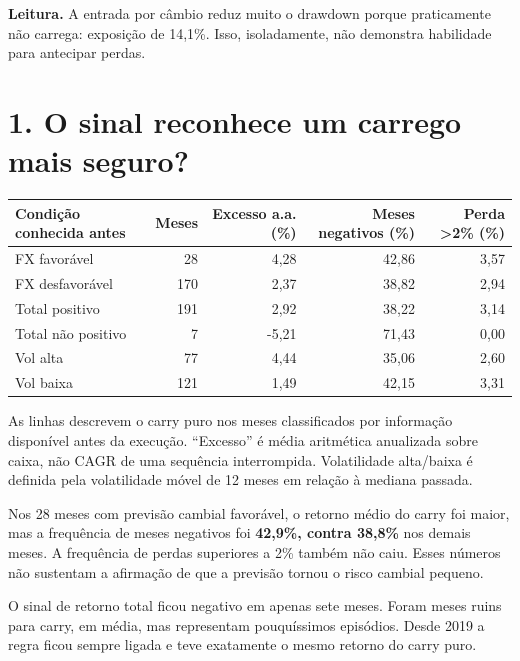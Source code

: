 \documentclass[11pt,a4paper]{article}
\begin{document}
\textbf{Leitura.} A entrada por câmbio reduz muito o drawdown porque praticamente não carrega: exposição de 14,1\%. Isso, isoladamente, não demonstra habilidade para antecipar perdas.

\clearpage
\section*{1. O sinal reconhece um carrego mais seguro?}\footnotesize\begin{center}\begin{tabular}{lrrrr}\toprule
Condição conhecida antes & Meses & Excesso a.a. (\%) & Meses negativos (\%) & Perda >2\% (\%) \\ \midrule
FX favorável & 28 & 4,28 & 42,86 & 3,57 \\
FX desfavorável & 170 & 2,37 & 38,82 & 2,94 \\
Total positivo & 191 & 2,92 & 38,22 & 3,14 \\
Total não positivo & 7 & -5,21 & 71,43 & 0,00 \\
Vol alta & 77 & 4,44 & 35,06 & 2,60 \\
Vol baixa & 121 & 1,49 & 42,15 & 3,31 \\
\bottomrule\end{tabular}\end{center}\normalsize

As linhas descrevem o carry puro nos meses classificados por informação disponível antes da execução. ``Excesso'' é média aritmética anualizada sobre caixa, não CAGR de uma sequência interrompida. Volatilidade alta/baixa é definida pela volatilidade móvel de 12 meses em relação à mediana passada.

Nos 28 meses com previsão cambial favorável, o retorno médio do carry foi maior, mas a frequência de meses negativos foi \textbf{42,9\%, contra 38,8\%} nos demais meses. A frequência de perdas superiores a 2\% também não caiu. Esses números não sustentam a afirmação de que a previsão tornou o risco cambial pequeno.

O sinal de retorno total ficou negativo em apenas sete meses. Foram meses ruins para carry, em média, mas representam pouquíssimos episódios. Desde 2019 a regra ficou sempre ligada e teve exatamente o mesmo retorno do carry puro.
\end{document}

